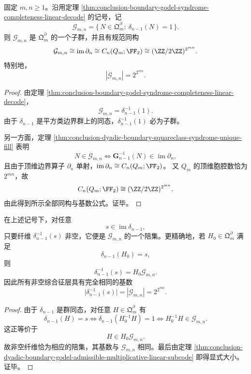 \begin{theorem}\label{thm:conclusion-dyadic-boundary-godel-admissible-multiplicative-linear-subcode}
固定 \(m,n\ge 1\)。沿用定理 \ref{thm:conclusion-boundary-godel-syndrome-completeness-linear-decode} 的记号，记
\[
\mathcal G_{m,n}
=
\{\,N\in \mathfrak Q_m^{\partial}:\ \delta_{n-1}(N)=1\,\}.
\]
则 \(\mathcal G_{m,n}\) 是 \(\mathfrak Q_m^{\partial}\) 的一个子群，并且有规范同构
\[
\mathcal G_{m,n}
\cong
\operatorname{im}\partial_n
\cong
C_n(Q_m;\FF_2)
\cong
(\ZZ/2\ZZ)^{2^{mn}}.
\]
特别地，
\[
|\mathcal G_{m,n}|=2^{2^{mn}}.
\]
\end{theorem}

\begin{proof}
由定理 \ref{thm:conclusion-boundary-godel-syndrome-completeness-linear-decode}，
\[
\mathcal G_{m,n}=\delta_{n-1}^{-1}(1).
\]
由于 \(\delta_{n-1}\) 是平方类边界群上的同态，\(\delta_{n-1}^{-1}(1)\) 必为子群。

另一方面，定理 \ref{thm:conclusion-dyadic-boundary-squareclass-syndrome-unique-fill} 表明
\[
N\in \mathcal G_{m,n}
\iff
\mathbf G_{n-1}^{-1}(N)\in \operatorname{im}\partial_n,
\]
且由于顶维边界算子 \(\partial_n\) 单射，\(\operatorname{im}\partial_n\cong C_n(Q_m;\FF_2)\)。
又 \(Q_m\) 的顶维胞腔数恰为 \(2^{mn}\)，故
\[
C_n(Q_m;\FF_2)\cong (\ZZ/2\ZZ)^{2^{mn}}.
\]
由此得到所示全部同构与基数公式。证毕。
\end{proof}

\begin{theorem}[综合征层的等势陪集几何]\label{thm:conclusion-dyadic-boundary-godel-syndrome-fibers-are-equipotent-cosets}
在上述记号下，对任意
\[
s\in \operatorname{im}\delta_{n-1},
\]
只要纤维 \(\delta_{n-1}^{-1}(s)\) 非空，它便是 \(\mathcal G_{m,n}\) 的一个陪集。更精确地，若 \(H_0\in\mathfrak Q_m^\partial\) 满足
\[
\delta_{n-1}(H_0)=s,
\]
则
\[
\delta_{n-1}^{-1}(s)=H_0\mathcal G_{m,n}.
\]
因此所有非空综合征层具有完全相同的基数
\[
\bigl|\delta_{n-1}^{-1}(s)\bigr|
=
|\mathcal G_{m,n}|
=
2^{2^{mn}}.
\]
\end{theorem}

\begin{proof}
由于 \(\delta_{n-1}\) 是群同态，对任意 \(H\in\mathfrak Q_m^\partial\) 有
\[
\delta_{n-1}(H)=s
\iff
\delta_{n-1}(H_0^{-1}H)=1
\iff
H_0^{-1}H\in \mathcal G_{m,n}.
\]
这正等价于
\[
H\in H_0\mathcal G_{m,n}.
\]
故非空纤维恰为相应的陪集，其基数与 \(\mathcal G_{m,n}\) 相同。最后由定理 \ref{thm:conclusion-dyadic-boundary-godel-admissible-multiplicative-linear-subcode} 即得显式大小。证毕。
\end{proof}

